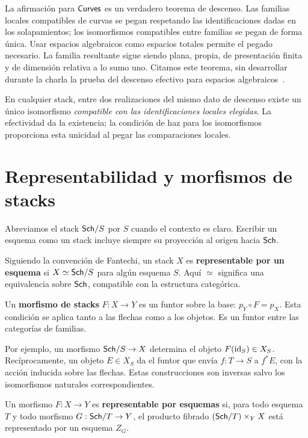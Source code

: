 \documentclass[12pt,openany]{memoir}
\begin{document}
La afirmación para \(\mathsf{Curves}\) es un verdadero teorema de descenso.
Las familias locales compatibles de curvas se pegan respetando las
identificaciones dadas en los solapamientos; los isomorfismos compatibles
entre familias se pegan de forma única. Usar espacios algebraicos como
espacios totales permite el pegado necesario. La familia resultante sigue
siendo plana, propia, de presentación finita y de dimensión relativa a lo
sumo uno. Citamos este teorema, sin desarrollar durante la charla la prueba
del descenso efectivo para espacios algebraicos~\cite{sp:curves}.

En cualquier stack, entre dos realizaciones del mismo dato de descenso
existe un único isomorfismo \emph{compatible con las identificaciones
locales elegidas}. La efectividad da la existencia; la condición de haz
para los isomorfismos proporciona esta unicidad al pegar las comparaciones
locales.

\section{Representabilidad y morfismos de stacks}
\label{sec:representability}

Abreviamos el stack \(\mathsf{Sch}/S\) por \(S\) cuando el contexto es claro.
Escribir un esquema como un stack incluye siempre su proyección al origen
hacia \(\mathsf{Sch}\).

\begin{Def}
Siguiendo la convención de Fantechi, un stack \(X\) es
\textbf{representable por un esquema} si
\(X\simeq\mathsf{Sch}/S\) para algún esquema \(S\). Aquí \(\simeq\) significa
una equivalencia sobre \(\mathsf{Sch}\), compatible con la estructura categórica.
\end{Def}

Un \textbf{morfismo de stacks} \(F:X\to Y\) es un funtor sobre la base:
\(p_Y\circ F=p_X\). Esta condición se aplica tanto a las flechas como
a los objetos. Es un funtor entre las categorías de familias.

Por ejemplo, un morfismo \(\mathsf{Sch}/S\to X\) determina el objeto
\(F(\operatorname{id}_S)\in X_S\). Recíprocamente, un objeto \(E\in X_S\) da el
funtor que envía \(f:T\to S\) a \(f^*E\), con la acción inducida sobre
las flechas. Estas construcciones son inversas salvo los isomorfismos
naturales correspondientes.

\begin{Def}
Un morfismo \(F:X\to Y\) es \textbf{representable por esquemas} si, para
todo esquema \(T\) y todo morfismo \(G:\mathsf{Sch}/T\to Y\), el producto
fibrado \((\mathsf{Sch}/T)\times_Y X\) está representado por un esquema \(Z_G\).
\end{Def}
\end{document}
